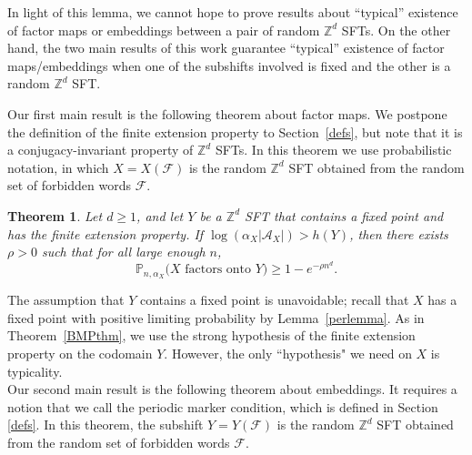 \documentclass[12pt]{amsart}
\newtheorem{theorem}{Theorem}[section]
\theoremstyle{definition}
\def\Z{\mathbb{Z}}
\DeclareMathOperator{\dist}{dist}
\newcommand{\kmmargin}[1]{\marginpar{\small\textcolor{blue}{[\sl
{#1}\rm]}}}
\begin{document}
In light of this lemma, we cannot hope to prove results about ``typical'' existence of factor maps or embeddings between a pair of random $\mathbb{Z}^d$ SFTs. On the other hand, the two main results of this work guarantee ``typical'' existence of factor maps/embeddings when one of the subshifts involved is fixed and the other is a random $\mathbb{Z}^d$ SFT.

Our first main result is the following theorem about factor maps. We postpone the definition of the finite extension property to Section~\ref{defs}, but note that it is a conjugacy-invariant property of $\mathbb{Z}^d$ SFTs. In this theorem we use probabilistic notation, in which $X = X(\mathcal{F})$ is the random $\mathbb{Z}^d$ SFT obtained from the random set of forbidden words $\mathcal{F}$.

\begin{theorem}\label{Thm:Factors}
Let $d \geq 1$, and let $Y$ be a $\mathbb{Z}^d$ SFT that contains a fixed point and has the finite extension property. 
If $\log(\alpha_X |\mathcal{A}_X|) > h(Y)$, then there exists $\rho > 0$ such that for all large enough $n$,
\begin{equation*}
\mathbb{P}_{n,\alpha_X}\bigl(X \textrm{ factors onto } Y \bigr) \geq 1 - e^{-\rho n^d}. 
\end{equation*}
\end{theorem}

The assumption that $Y$ contains a fixed point is unavoidable; recall that $X$ has a fixed point with positive limiting probability by Lemma~\ref{perlemma}. As in Theorem~\ref{BMPthm}, we use the strong hypothesis of the finite extension property on the codomain $Y$. However, the only ``hypothesis" we need on $X$ is typicality.\\


Our second main result is the following theorem about embeddings. It requires a notion that we call the periodic marker condition, which is defined in Section \ref{defs}. In this theorem, the subshift $Y = Y(\mathcal{F})$ is the random $\mathbb{Z}^d$ SFT obtained from the random set of forbidden words $\mathcal{F}$.
\end{document}
